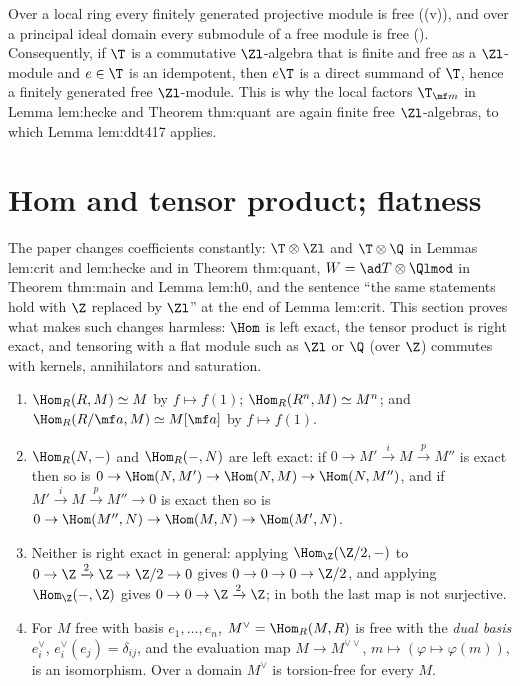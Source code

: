 \begin{remark}\label{rem:modules:projective-free}
Over a local ring every finitely generated projective module is free ((v)), and over a principal
ideal domain every submodule of a free module is free (). Consequently, if $\T$ is a
commutative $\Zl$-algebra that is finite and free as a $\Zl$-module and $e\in\T$ is an idempotent, then $e\T$ is a direct
summand of $\T$, hence a finitely generated free $\Zl$-module. This is why the local factors $\T_{\mf m}$ in Lemma lem:hecke and
Theorem thm:quant are again finite free $\Zl$-algebras, to which Lemma lem:ddt417 applies.
\end{remark}

\section{Hom and tensor product; flatness}\label{sec:modules:tensor}

The paper changes coefficients constantly: $\T\otimes\Zl$ and $\T\otimes\Q$ in Lemmas lem:crit and lem:hecke and in Theorem
thm:quant, $W=\ad T\otimes\Qlmod$ in Theorem thm:main and Lemma lem:h0, and the sentence ``the same statements hold with $\Z$
replaced by $\Zl$'' at the end of Lemma lem:crit. This section proves what makes such changes harmless: $\Hom$ is left exact,
the tensor product is right exact, and tensoring with a flat module such as $\Zl$ or $\Q$ (over $\Z$) commutes with kernels,
annihilators and saturation.

\begin{proposition}[Hom]\label{prop:modules:hom}
\begin{enumerate}[label=(\roman*)]
\item $\Hom_R(R,M)\simeq M$ by $f\mapsto f(1)$; $\Hom_R(R^n,M)\simeq M^n$; and $\Hom_R(R/\mf a,M)\simeq M[\mf a]$ by $f\mapsto f(1)$.
\item $\Hom_R(N,-)$ and $\Hom_R(-,N)$ are left exact: if $0\to M'\xrightarrow{i}M\xrightarrow{p}M''$ is exact then so is
$0\to\Hom(N,M')\to\Hom(N,M)\to\Hom(N,M'')$, and if $M'\xrightarrow{i}M\xrightarrow{p}M''\to0$ is exact then so is
$0\to\Hom(M'',N)\to\Hom(M,N)\to\Hom(M',N)$.
\item Neither is right exact in general: applying $\Hom_\Z(\Z/2,-)$ to $0\to\Z\xrightarrow{2}\Z\to\Z/2\to0$ gives $0\to0\to0\to\Z/2$, and
applying $\Hom_\Z(-,\Z)$ gives $0\to0\to\Z\xrightarrow{2}\Z$; in both the last map is not surjective.
\item For $M$ free with basis $e_1,\dots,e_n$, $M^\vee=\Hom_R(M,R)$ is free with the \emph{dual basis} $e_i^\vee$,
$e_i^\vee(e_j)=\delta_{ij}$, and the evaluation map $M\to M^{\vee\vee}$, $m\mapsto(\varphi\mapsto\varphi(m))$, is an isomorphism. Over a
domain $M^\vee$ is torsion-free for every $M$.
\end{enumerate}
\end{proposition}

